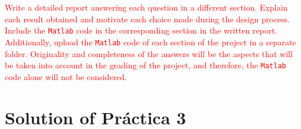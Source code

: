 \documentclass{article}
\begin{document}
\noindent
\textcolor{red}{Write a detailed report answering each question in a different section. Explain each result obtained and motivate each choice made during the design process. Include the \texttt{Matlab} code in the corresponding section in the written report. Additionally, upload the \texttt{Matlab} code of each section of the project in a separate folder. Originality and completeness of the answers will be the aspects that will be taken into account in the grading of the project, and therefore, the \texttt{Matlab} code alone will not be considered.} 


\newpage













\section*{Solution of Pr\'actica 3}
\end{document}

